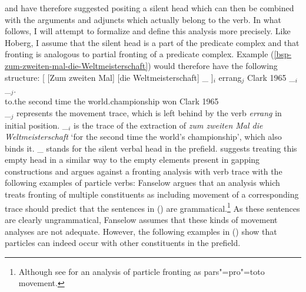 \citet{Fanselow93a} and \citet[]{Hoberg97a} have therefore suggested positing a silent head which
can then be combined with the arguments and adjuncts which actually belong to the verb.
In what follows, I will attempt to formalize and define this analysis more precisely.  
Like Hoberg, I assume that the silent head is a part of the predicate complex and that fronting is analogous
to partial fronting of a predicate complex.
Example (\ref{bsp-zum-zweiten-mal-die-Weltmeisterschaft}) would therefore have the following structure:
\ea
\label{ex-zum-zweiten-anal}%
\gll {}[ [Zum zweiten Mal] [die Weltmeisterschaft] \_ ]$_i$ errang$_j$ Clark 1965 \_$_i$ \_$_j$.\\
     {}          \spacebr{}to.the second time  \spacebr{}the world.championship {} {} won Clark 1965\\
\z
\_$_j$ represents the movement trace, which is left behind by the verb \emph{errang} in initial position.
\_$_i$ is the trace of the extraction of \emph{zum zweiten Mal die Weltmeisterschaft}
`for the second time the world's championship',  which also binds it.
\_ stands for the silent verbal head in the prefield.
\citet[]{Fanselow93a} suggests treating this empty head in a similar way to the empty elements present
in gapping constructions and argues against a fronting analysis with verb trace with the following examples
of particle verbs:
\eal
{}
\zl
Fanselow argues that an analysis which treats fronting of multiple constituents as including movement of a 
corresponding trace should predict that the sentences in () are grammatical.\footnote{
		Although see  for an analysis of particle fronting
		as pars"=pro"=toto movement.%
}
As these sentences are clearly ungrammatical, Fanselow assumes that these kinds of movement analyses are not
adequate. However, the following examples in () show that particles can indeed occur with other constituents
in the prefield.

